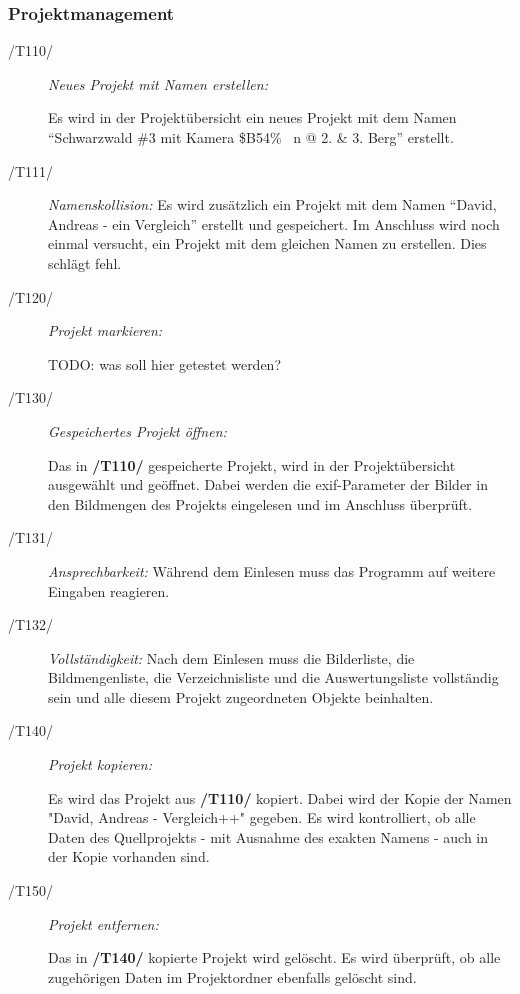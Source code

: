 	\subsubsection{Projektmanagement}
	
		\begin{description}
		
			\item[/T110/] \textit{Neues Projekt mit Namen erstellen:}\par Es wird in der Projektübersicht ein neues Projekt mit dem Namen "`Schwarzwald \#3 mit Kamera \$B54\% ~n @ 2. \& 3. Berg"' erstellt.
			
			\item[/T111/] \textit{Namenskollision:} Es wird zusätzlich ein Projekt mit dem Namen "`David, Andreas - ein Vergleich"' erstellt und gespeichert. Im Anschluss wird noch einmal versucht, ein Projekt mit dem gleichen Namen zu erstellen. Dies schlägt fehl.
				
			\item[/T120/] \textit{Projekt markieren:}\par TODO: was soll hier getestet werden?
				
			\item[/T130/] \textit{Gespeichertes Projekt öffnen:}\par Das in \textbf{/T110/} gespeicherte Projekt, wird in der Projektübersicht ausgewählt und geöffnet. Dabei werden die \gls{exif}-Parameter der Bilder in den Bildmengen des Projekts eingelesen und im Anschluss überprüft.

			\item[/T131/] \textit{Ansprechbarkeit:}	Während dem Einlesen muss das Programm auf weitere Eingaben reagieren.
			
			\item[/T132/] \textit{Vollständigkeit:} Nach dem Einlesen muss die Bilderliste, die Bildmengenliste, die Verzeichnisliste und die Auswertungsliste vollständig sein und alle diesem Projekt zugeordneten Objekte beinhalten.
			
			\item[/T140/] \textit{Projekt kopieren:}\par Es wird das Projekt aus \textbf{/T110/} kopiert. Dabei wird der Kopie der Namen "David, Andreas - Vergleich++" gegeben. Es wird kontrolliert, ob alle Daten des Quellprojekts - mit Ausnahme des exakten Namens - auch in der Kopie vorhanden sind.
				
			\item[/T150/] \textit{Projekt entfernen:}\par Das in \textbf{/T140/} kopierte Projekt wird gelöscht. Es wird überprüft, ob alle zugehörigen Daten im Projektordner ebenfalls gelöscht sind.
		
		\end{description}
	
